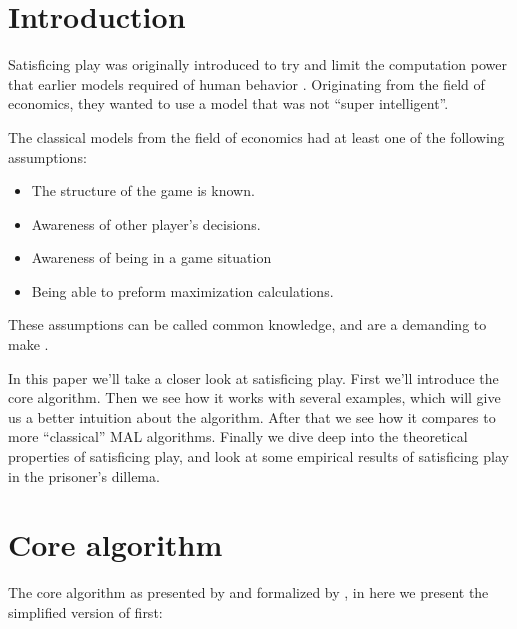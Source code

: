 \section{Introduction}
\label{sec:introduction}
\toReview
Satisficing play was originally introduced
to try and limit the computation power that earlier models required of human
behavior \citep{herbert}. Originating from the field of economics, they
wanted to use a model that was not ``super intelligent''.

The classical models from the field of economics had at least one of the
following assumptions:
\begin{itemize}
\itemsep0em 
  \item The structure of the game is known.
  \item Awareness of other player's decisions.
  \item Awareness of being in a game situation
  \item Being able to preform maximization calculations.
\end{itemize}

These assumptions can be called common knowledge, and are a demanding to
make \citep{binmore}. 

In this paper we'll take a closer look at satisficing play. First we'll introduce
the core algorithm. Then we see how it works with several examples, which will
give us a better intuition about the algorithm. After that we see how it
compares to more ``classical'' MAL algorithms. Finally we dive deep into the
theoretical properties of satisficing play, and look at some empirical results
of satisficing play in the prisoner's dillema.

\section{Core algorithm}
\label{sec:core-algorithm}
\toReview The core algorithm as presented by \citep{herbert} and formalized by
\citep{karandikar},
in here we present the simplified version of \citep{stimpson:2001} first:

